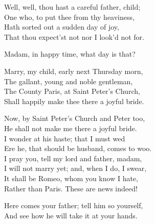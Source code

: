 \begin{speech}
Well, well, thou hast a careful father, child;
\\
One who, to put thee from thy heaviness, \\
Hath sorted out a sudden day of joy, \\
That thou expect'st not nor I look'd not for. \\
\end{speech}
\begin{speech}
Madam, in happy time, what day is that? \\
\end{speech}
\begin{speech}
Marry, my child, early next Thursday morn, \\

The gallant, young and noble gentleman, \\
The County Paris, at Saint Peter's Church, \\
Shall happily make thee there a joyful bride. \\
\end{speech}
\begin{speech}
Now, by Saint Peter's Church and Peter too, \\
He shall not make me there a joyful bride. \\
I wonder at his haste; that I must wed \\
Ere he, that should be husband, comes to woo. \\
I pray you, tell my lord and father, madam, \\
I will not marry yet; and, when I do, I swear, \\
It shall be Romeo, whom you know I hate, \\
Rather than Paris. These are news indeed! \\
\end{speech}
\begin{speech}
Here comes your father; tell him so yourself,
\\
And see how he will take it at your hands. 
\\
\end{speech}
